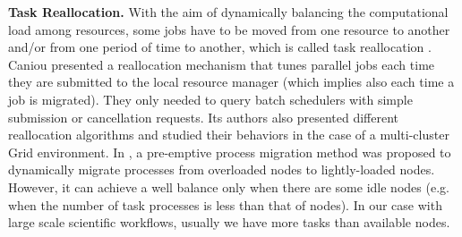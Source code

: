\textbf{Task Reallocation.} With the aim of dynamically balancing the computational load among resources, some jobs have to be moved from one resource to another and/or from one period of time to another, which is called task reallocation \cite{Tomas2012}. Caniou  \cite{Caniou2011} presented a reallocation mechanism that tunes parallel jobs each time they are submitted to the local resource manager (which implies also each time a job is migrated). They only needed to query batch schedulers with simple submission or cancellation requests.  Its authors also presented different reallocation algorithms and studied their behaviors in the case of a multi-cluster Grid environment. In \cite{Zhang2000}, a pre-emptive process migration method was proposed to dynamically migrate processes from overloaded nodes to lightly-loaded nodes. However, it can achieve a well balance only when there are some idle nodes (e.g. when the number of task processes is less than that of nodes). In our case with large scale scientific workflows, usually we have more tasks than available nodes. 





